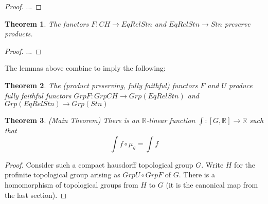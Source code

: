 \documentclass[13pt]{amsart}
\newtheorem{theorem}{Theorem}
\theoremstyle{definition}
\begin{document}
\begin{proof}
...
\end{proof}

\begin{theorem}
The functors $F : CH \rightarrow EqRel Stn$ and $EqRel Stn \rightarrow Stn$ preserve products.
\end{theorem}

\begin{proof}
...
\end{proof}

The lemmas above combine to imply the following:

\begin{theorem}
The (product preserving, fully faithful) functors $F$ and $U$ produce fully faithful functors $Grp F : Grp CH \rightarrow Grp (EqRel Stn)$ and $Grp (EqRel Stn) \rightarrow Grp (Stn)$ 
\end{theorem}

\begin{theorem}(Main Theorem)
There is an $\mathbb{R}$-linear function $\int : [G,\mathbb{R}] \rightarrow \mathbb{R}$ such that 
\[ \int f \circ \mu_g = \int f  \]
\end{theorem}

\begin{proof}
Consider such a compact hausdorff topological group $G$. Write $H$ for the profinite topological group arising as $Grp U \circ Grp F$ of $G$. There is a homomorphism of topological groups from $H$ to $G$ (it is the canonical map from the last section).
\end{proof}
\end{document}

